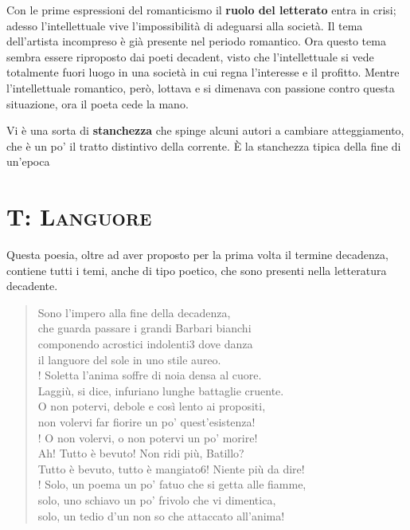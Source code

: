 \documentclass{book}
\newcommand{\evidenziatore}[1]{\textbf{#1}}
\begin{document}
Con le prime espressioni del romanticismo il
\evidenziatore{ruolo del letterato} entra in crisi; adesso
l'intellettuale vive l'impossibilità di adeguarsi alla società. Il tema
dell'artista incompreso è già presente nel periodo romantico. Ora questo
tema sembra essere riproposto dai poeti decadent, visto che
l'intellettuale si vede totalmente fuori luogo in una società in cui
regna l'interesse e il profitto. Mentre l'intellettuale romantico, però,
lottava e si dimenava con passione contro questa situazione, ora il
poeta cede la mano.

Vi è una sorta di \evidenziatore{stanchezza} che spinge alcuni autori a
cambiare atteggiamento, che è un po' il tratto distintivo della
corrente. È la stanchezza tipica della fine di un'epoca

\section{T: \textsc{Languore}}

Questa poesia, oltre ad aver proposto per la prima volta il termine
decadenza, contiene tutti i temi, anche di tipo poetico, che sono
presenti nella letteratura decadente.

\begin{verse}
Sono l’impero alla fine della decadenza,\\
che guarda passare i grandi Barbari bianchi\\
componendo acrostici indolenti3 dove danza\\
il languore del sole in uno stile aureo.\\!
Soletta l’anima soffre di noia densa al cuore.\\
Laggiù, si dice, infuriano lunghe battaglie cruente.\\
O non potervi, debole e così lento ai propositi,\\
non volervi far fiorire un po’ quest’esistenza!\\!
O non volervi, o non potervi un po’ morire!\\
Ah! Tutto è bevuto! Non ridi più, Batillo?\\
Tutto è bevuto, tutto è mangiato6! Niente più da dire!\\!
Solo, un poema un po’ fatuo che si getta alle fiamme,\\
solo, uno schiavo un po’ frivolo che vi dimentica,\\
solo, un tedio d’un non so che attaccato all’anima!
\end{verse}
\end{document}
